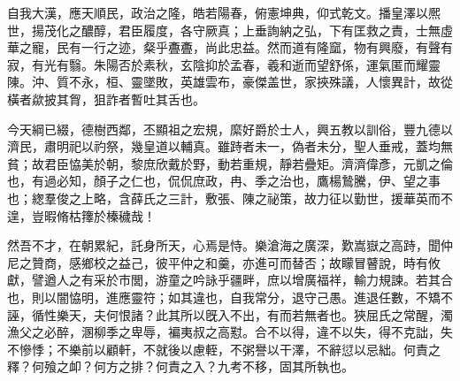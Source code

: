 \begin{pinyinscope}
自我大漢，應天順民，政治之隆，皓若陽春，俯憲坤典，仰式乾文。播皇澤以熈世，揚茂化之醲醇，君臣履度，各守厥真；上垂詢納之弘，下有匡救之責，士無虛華之寵，民有一行之迹，粲乎斖斖，尚此忠益。然而道有隆窳，物有興廢，有聲有寂，有光有翳。朱陽否於素秋，玄陰抑於孟春，羲和逝而望舒係，運氣匿而耀靈陳。沖、質不永，桓、靈墜敗，英雄雲布，豪傑盖世，家挾殊議，人懷異計，故從橫者歘披其胷，狙詐者暫吐其舌也。

今天綱已綴，德樹西鄰，丕顯祖之宏規，縻好爵於士人，興五教以訓俗，豐九德以濟民，肅明祀以礿祭，幾皇道以輔真。雖跱者未一，偽者未分，聖人垂戒，蓋均無貧；故君臣恊美於朝，黎庶欣戴於野，動若重規，靜若疊矩。濟濟偉彥，元凱之倫也，有過必知，顏子之仁也，侃侃庶政，冉、季之治也，鷹楊鷙騰，伊、望之事也；緫羣俊之上略，含薛氏之三計，敷張、陳之祕策，故力征以勤世，援華英而不遑，豈暇脩枯籜於榛穢哉！

然吾不才，在朝累紀，託身所天，心焉是恃。樂滄海之廣深，歎嵩嶽之高跱，聞仲尼之贊商，感鄉校之益己，彼平仲之和羹，亦進可而替否；故矇冒瞽說，時有攸獻，譬遒人之有采於市閭，游童之吟詠乎疆畔，庶以增廣福祥，輸力規諫。若其合也，則以闇恊明，進應靈符；如其違也，自我常分，退守己愚。進退任數，不矯不誣，循性樂天，夫何恨諸？此其所以旣入不出，有而若無者也。狹屈氏之常醒，濁漁父之必醉，溷柳季之卑辱，褊夷叔之高懟。合不以得，違不以失，得不克詘，失不慘悸；不樂前以顧軒，不就後以慮輊，不粥譽以干澤，不辭愆以忌絀。何責之釋？何飱之卹？何方之排？何責之入？九考不移，固其所執也。


\end{pinyinscope}
